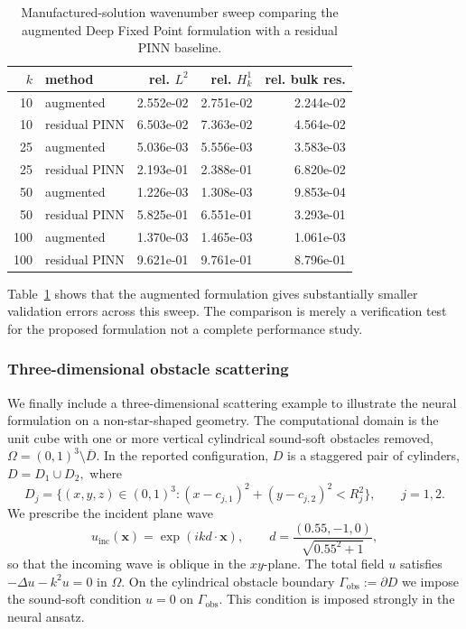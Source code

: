 \documentclass[twoside,11pt]{article}
\newcommand{\qp}[1]{\ensuremath{\!\left({#1}\right)}}
\renewcommand{\vec}[1]{\boldsymbol{#1}}
\begin{document}
{\begin{table}[htbp]
\centering
\begin{tabular}{rlrrr}
\hline
$k$ & method & rel. $L^2$ & rel. $H^1_k$ & rel. bulk res. \\
\hline
10 & augmented & 2.552e-02 & 2.751e-02 & 2.244e-02 \\
10 & residual PINN & 6.503e-02 & 7.363e-02 & 4.564e-02 \\
\hline
25 & augmented & 5.036e-03 & 5.556e-03 & 3.583e-03 \\
25 & residual PINN & 2.193e-01 & 2.388e-01 & 6.820e-02 \\
\hline
50 & augmented & 1.226e-03 & 1.308e-03 & 9.853e-04 \\
50 & residual PINN & 5.825e-01 & 6.551e-01 & 3.293e-01 \\
\hline
100 & augmented & 1.370e-03 & 1.465e-03 & 1.061e-03 \\
100 & residual PINN & 9.621e-01 & 9.761e-01 & 8.796e-01 \\
\hline
\end{tabular}
\caption{Manufactured-solution wavenumber sweep comparing the augmented Deep Fixed Point formulation with a residual PINN baseline. }
\label{tab:nn-mms-k-sweep-augmented-vs-pinns}
\end{table}

Table~\ref{tab:nn-mms-k-sweep-augmented-vs-pinns} shows that the augmented formulation gives substantially smaller validation errors across this sweep. The comparison is merely a verification test for the proposed formulation not a complete performance study.

\subsubsection*{Three-dimensional obstacle scattering}
\label{subsec:nn-3d-obstacle-scattering}

We finally include a three-dimensional scattering example to
illustrate the neural formulation on a non-star-shaped geometry. The
computational domain is the unit cube with one or more vertical
cylindrical sound-soft obstacles removed,
$\Omega=(0,1)^3\setminus\overline D .$ In the reported configuration,
$D$ is a staggered pair of cylinders, $D = D_1 \cup D_2 ,$ where
\begin{equation}
D_j
=
\{(x,y,z)\in(0,1)^3:
(x-c_{j,1})^2+(y-c_{j,2})^2<R_j^2\},
\qquad j=1,2 .
\end{equation}
We prescribe the incident plane wave
\begin{equation}
u_{\mathrm{inc}}(\vec x)
=
\exp\qp{ik d\cdot \vec x},
\qquad
d=\frac{(0.55,-1,0)}{\sqrt{0.55^2+1}} ,
\end{equation}
so that the incoming wave is oblique in the $xy$-plane. The total
field $u$ satisfies $-\Delta u-k^2u=0$ in $\Omega .$ On the
cylindrical obstacle boundary $\Gamma_{\mathrm{obs}}:=\partial D$ we
impose the sound-soft condition $u=0$ on $\Gamma_{\mathrm{obs}}.$ This
condition is imposed strongly in the neural ansatz.

}
\end{document}
